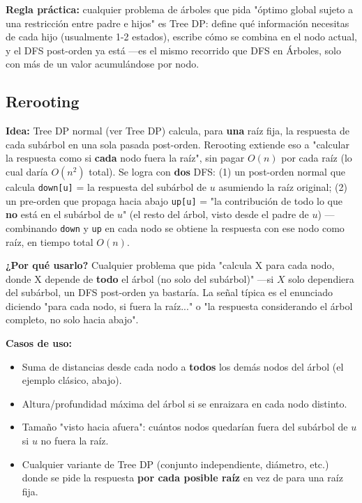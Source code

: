 \documentclass[10pt,a4paper,twocolumn]{article}
\begin{document}
\textbf{Regla práctica:} cualquier problema de árboles que pida
"óptimo global sujeto a una restricción entre padre e hijos" es Tree
DP: define qué información necesitas de cada hijo (usualmente 1-2
estados), escribe cómo se combina en el nodo actual, y el DFS
post-orden ya está —es el mismo recorrido que DFS en Árboles, solo
con más de un valor acumulándose por nodo.

\subsection{Rerooting}

\textbf{Idea:} Tree DP normal (ver Tree DP) calcula, para \textbf{una}
raíz fija, la respuesta de cada subárbol en una sola pasada
post-orden. Rerooting extiende eso a "calcular la respuesta como si
\textbf{cada} nodo fuera la raíz", sin pagar $O(n)$ por cada raíz
(lo cual daría $O(n^2)$ total). Se logra con \textbf{dos} DFS: (1) un
post-orden normal que calcula \texttt{down[u]} = la respuesta del
subárbol de $u$ asumiendo la raíz original; (2) un pre-orden que
propaga hacia abajo \texttt{up[u]} = "la contribución de todo lo que
\textbf{no} está en el subárbol de $u$" (el resto del árbol, visto
desde el padre de $u$) — combinando \texttt{down} y \texttt{up} en
cada nodo se obtiene la respuesta con ese nodo como raíz, en tiempo
total $O(n)$.

\textbf{¿Por qué usarlo?} Cualquier problema que pida "calcula X para
cada nodo, donde X depende de \textbf{todo} el árbol (no solo del
subárbol)" —si $X$ solo dependiera del subárbol, un DFS post-orden ya
bastaría. La señal típica es el enunciado diciendo "para cada nodo,
si fuera la raíz..." o "la respuesta considerando el árbol completo,
no solo hacia abajo".

\textbf{Casos de uso:}

\begin{itemize}
    \item Suma de distancias desde cada nodo a \textbf{todos} los
    demás nodos del árbol (el ejemplo clásico, abajo).
    \item Altura/profundidad máxima del árbol si se enraizara en cada
    nodo distinto.
    \item Tamaño "visto hacia afuera": cuántos nodos quedarían fuera
    del subárbol de $u$ si $u$ no fuera la raíz.
    \item Cualquier variante de Tree DP (conjunto independiente,
    diámetro, etc.) donde se pide la respuesta \textbf{por cada
    posible raíz} en vez de para una raíz fija.
\end{itemize}
\end{document}
